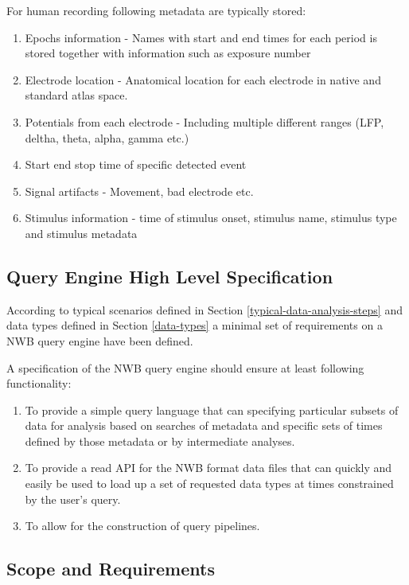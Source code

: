 \documentclass[utf8]{frontiersSCNS} %
\begin{document}
For human recording following metadata are typically stored:

\begin{enumerate}
 \item Epochs information - Names with start and end times for each period is stored together with information such as exposure number
 \item Electrode location - Anatomical location for each electrode in native and standard atlas space.
 \item Potentials from each electrode - Including multiple different ranges (LFP, deltha, theta, alpha, gamma etc.)
 \item Start end stop time of specific detected event
 \item Signal artifacts - Movement, bad electrode etc.
 \item Stimulus information - time of stimulus onset, stimulus name, stimulus type and stimulus metadata
\end{enumerate}



\subsection{Query Engine High Level Specification}
\label{Query_engine_specification}

According to typical scenarios defined in Section \ref{typical-data-analysis-steps} and data types defined in Section \ref{data-types} a minimal set of requirements on a NWB query engine have been defined.

A specification of the NWB query engine should ensure at least following functionality:
\begin{enumerate}
 \item To provide a simple query language that can specifying particular subsets of data for analysis based on searches of metadata and specific sets of times defined by those metadata or by intermediate analyses.
 \item To provide a read API for the NWB format data files that can quickly and easily be used to load up a set of requested data types at times constrained by the user’s query.
 \item To allow for the construction of query pipelines.
\end{enumerate}


\subsection{Scope and Requirements}
\label{Scope_and_requirements}
\end{document}
